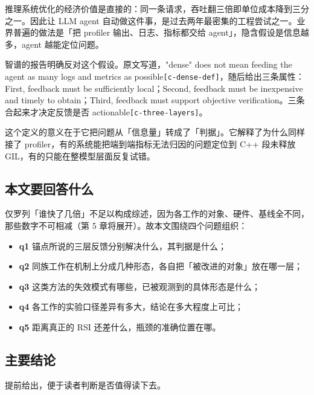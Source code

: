 推理系统优化的经济价值是直接的：同一条请求，吞吐翻三倍即单位成本降到三分之一。因此让 LLM agent 自动做这件事，是过去两年最密集的工程尝试之一。业界普遍的做法是「把 profiler 输出、日志、指标都交给 agent」，隐含假设是信息越多，agent 越能定位问题。


智谱的报告明确反对这个假设。原文写道，"dense" does not mean feeding the agent as many logs and metrics as possible{\scriptsize\texttt{[c-\hspace{0pt}dense-\hspace{0pt}def]}}，随后给出三条属性：First, feedback must be sufficiently local；Second, feedback must be inexpensive and timely to obtain；Third, feedback must support objective verification。三条合起来才决定反馈是否 actionable{\scriptsize\texttt{[c-\hspace{0pt}three-\hspace{0pt}layers]}}。


这个定义的意义在于它把问题从「信息量」转成了「判据」。它解释了为什么同样接了 profiler，有的系统能把端到端指标无法归因的问题定位到 C++ 段未释放 GIL，有的只能在整模型层面反复试错。


\subsection{本文要回答什么}

仅罗列「谁快了几倍」不足以构成综述，因为各工作的对象、硬件、基线全不同，那些数字不可相减（第 5 章将展开）。故本文围绕四个问题组织：


\begin{itemize}
  \item \textbf{q1} 锚点所说的三层反馈分别解决什么，其判据是什么；
  \item \textbf{q2} 同族工作在机制上分成几种形态，各自把「被改进的对象」放在哪一层；
  \item \textbf{q3} 这类方法的失效模式有哪些，已被观测到的具体形态是什么；
  \item \textbf{q4} 各工作的实验口径差异有多大，结论在多大程度上可比；
  \item \textbf{q5} 距离真正的 RSI 还差什么，瓶颈的准确位置在哪。
\end{itemize}

\subsection{主要结论}

提前给出，便于读者判断是否值得读下去。


